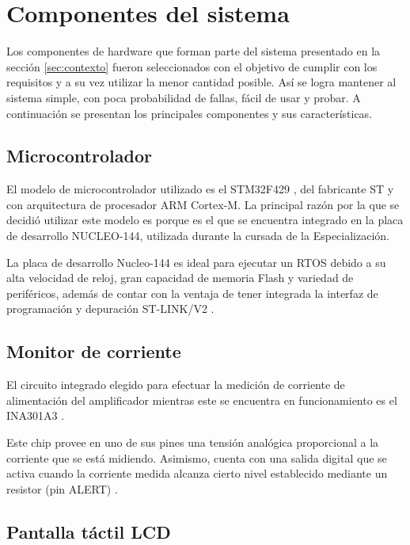 \section{Componentes del sistema}

Los componentes de hardware que forman parte del sistema presentado en la sección \ref{sec:contexto} fueron seleccionados con el objetivo de cumplir con los requisitos y a su vez utilizar la menor cantidad posible. Así se logra mantener al sistema simple, con poca probabilidad de fallas, fácil de usar y probar. A continuación se presentan los principales componentes y sus características.

\subsection{Microcontrolador}

El modelo de microcontrolador utilizado es el STM32F429 \citep{STM32F429}, del fabricante ST y con arquitectura de procesador ARM Cortex-M. La principal razón por la que se decidió utilizar este modelo es porque es el que se encuentra integrado en la placa de desarrollo NUCLEO-144, utilizada durante la cursada de la Especialización.

La placa de desarrollo Nucleo-144 es ideal para ejecutar un RTOS debido a su alta velocidad de reloj, gran capacidad de memoria Flash y variedad de periféricos, además de contar con la ventaja de tener integrada la interfaz de programación y depuración ST-LINK/V2 \citep{NUCLEO144}.

\subsection{Monitor de corriente}

El circuito integrado elegido para efectuar la medición de corriente de alimentación del amplificador mientras este se encuentra en funcionamiento es el INA301A3 \citep{INA301}.

Este chip provee en uno de sus pines una tensión analógica proporcional a la corriente que se está midiendo. Asimismo, cuenta con una salida digital que se activa cuando la corriente medida alcanza cierto nivel establecido mediante un resistor (pin ALERT) \citep{INA301}.

\subsection{Pantalla táctil LCD}
\label{sec:pantLCD}

